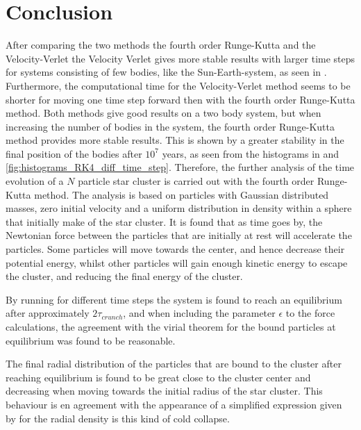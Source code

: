 \chapter{Conclusion}

After comparing the two methods the fourth order Runge-Kutta and the Velocity-Verlet the Velocity Verlet gives more stable results with larger time steps for systems consisting of few bodies, like the Sun-Earth-system, as seen in . 
Furthermore, the computational time for the Velocity-Verlet method seems to be shorter for moving one time step forward then with the fourth order Runge-Kutta method. 
Both methods give good results on a two body system, but when increasing the number of bodies in the system, the fourth order Runge-Kutta method provides more stable results. 
This is shown by a greater stability in the final position of the bodies after $10^7$ years, as seen from the histograms in 
 and \ref{fig:histograms_RK4_diff_time_step}.
Therefore, the further analysis of the time evolution of a $N$ particle star cluster is carried out with the fourth order Runge-Kutta method.
The analysis is based on particles with Gaussian distributed masses, zero initial velocity and a uniform distribution in density within a sphere that initially make of the star cluster.
It is found that as time goes by, the Newtonian force between the particles that are initially at rest will accelerate the particles. 
Some particles will move towards the center, and hence decrease their potential energy, whilst other particles will gain enough kinetic energy to escape the cluster, and reducing the final energy of the cluster.

By running for different time steps the system is found to reach an equilibrium after approximately $2\tau_{crunch}$, and when including the parameter $\epsilon$ to the force calculations, the agreement with the virial theorem for the bound particles at equilibrium was found to be reasonable.

The final radial distribution of the particles that are bound to the cluster after reaching equilibrium is found to be great close to the cluster center and decreasing when moving towards the initial radius of the star cluster. 
This behaviour is en agreement with the appearance of a simplified expression given by  for the radial density is this kind of cold collapse.  

  